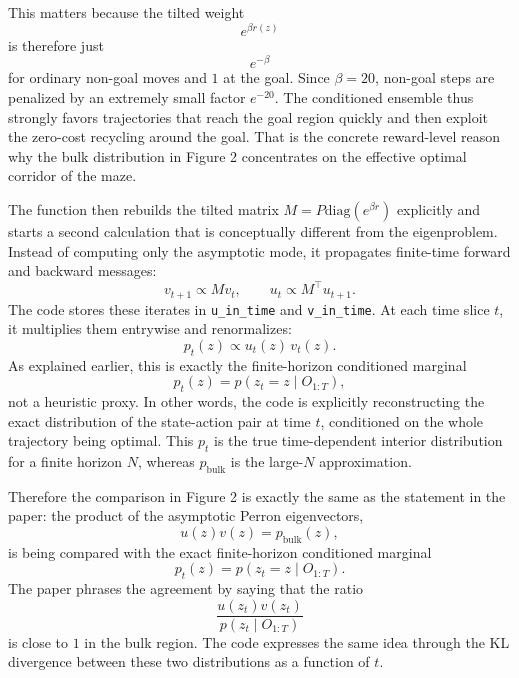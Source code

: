 \documentclass[11pt]{article}
\begin{document}
This matters because the tilted weight
\begin{equation}
    e^{\beta r(z)}
\end{equation}
is therefore just
\begin{equation}
    e^{-\beta}
\end{equation}
for ordinary non-goal moves and \(1\) at the goal. Since \(\beta=20\), non-goal steps are
penalized by an extremely small factor \(e^{-20}\). The conditioned ensemble thus strongly
favors trajectories that reach the goal region quickly and then exploit the zero-cost
recycling around the goal. That is the concrete reward-level reason why the bulk distribution
in Figure 2 concentrates on the effective optimal corridor of the maze.

The function then rebuilds the tilted matrix \(M=P\mathrm{diag}(e^{\beta r})\) explicitly and
starts a second calculation that is conceptually different from the eigenproblem. Instead of
computing only the asymptotic mode, it propagates finite-time forward and backward messages:
\begin{equation}
    v_{t+1} \propto M v_t,
    \qquad
    u_{t} \propto M^\top u_{t+1}.
\end{equation}
The code stores these iterates in \texttt{u\_in\_time} and \texttt{v\_in\_time}. At each time
slice \(t\), it multiplies them entrywise and renormalizes:
\begin{equation}
    p_t(z) \propto u_t(z)\,v_t(z).
\end{equation}
As explained earlier, this is exactly the finite-horizon conditioned marginal
\begin{equation}
    p_t(z)=p(z_t=z\mid O_{1:T}),
\end{equation}
not a heuristic proxy. In other words, the code is explicitly reconstructing the exact
distribution of the state-action pair at time \(t\), conditioned on the whole trajectory being
optimal. This \(p_t\) is the true time-dependent interior distribution for a finite horizon
\(N\), whereas \(p_{\mathrm{bulk}}\) is the large-\(N\) approximation.

Therefore the comparison in Figure 2 is exactly the same as the statement in the paper: the
product of the asymptotic Perron eigenvectors,
\begin{equation}
    u(z)v(z)=p_{\mathrm{bulk}}(z),
\end{equation}
is being compared with the exact finite-horizon conditioned marginal
\begin{equation}
    p_t(z)=p(z_t=z\mid O_{1:T}).
\end{equation}
The paper phrases the agreement by saying that the ratio
\begin{equation}
    \frac{u(z_t)v(z_t)}{p(z_t\mid O_{1:T})}
\end{equation}
is close to \(1\) in the bulk region. The code expresses the same idea through the KL
divergence between these two distributions as a function of \(t\).
\end{document}
